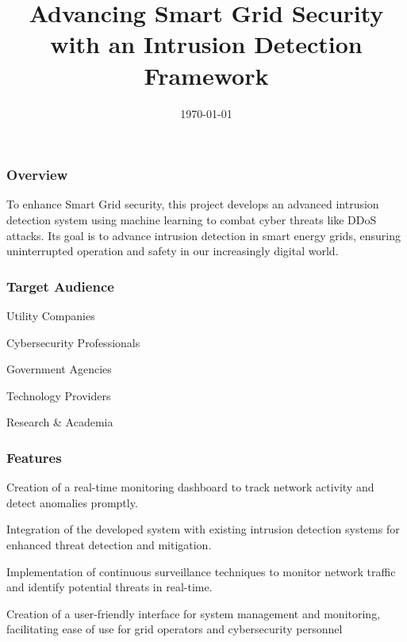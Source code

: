 \documentclass{beamer}
\title[IDS in Smart Grid]{Advancing Smart Grid Security with an Intrusion Detection Framework}
\author[Jayashre]{\teamMember{Jayashre}}
\date{\today}
\begin{document}
\begin{frame}
\titlepage
\end{frame}



\begin{frame}
\frametitle{Overview}
\begin{block}{To enhance Smart Grid security, this project develops an advanced intrusion detection system using machine learning to combat cyber threats like DDoS attacks. Its goal is to advance intrusion detection in smart energy grids, ensuring uninterrupted operation and safety in our increasingly digital world.}
\end{block}
\end{frame}

\begin{frame}
\frametitle{Target Audience}
\begin{block}{Utility Companies}
\end{block}
\begin{block}{Cybersecurity Professionals}
\end{block}
\begin{block}{Government Agencies}
\end{block}
\begin{block}{Technology Providers}
\end{block}
\begin{block}{Research \& Academia}
\end{block}
\end{frame}

\begin{frame}
\frametitle{Features}
\begin{block}{Creation of a real-time monitoring dashboard to track network activity and detect anomalies promptly.}
\end{block}
\begin{block}{Integration of the developed system with existing intrusion detection systems for enhanced threat detection and mitigation.}
\end{block}
\begin{block}{Implementation of continuous surveillance techniques to monitor network traffic and identify potential threats in real-time.}
\end{block}
\begin{block}{ Creation of a user-friendly interface for system management and monitoring, facilitating ease of use for grid operators and cybersecurity personnel}
\end{block}
\end{frame}
\end{document}
